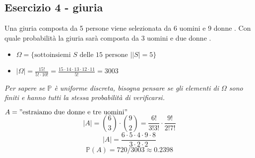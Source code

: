 \documentclass[12pt,a4paper, openany]{book}
\begin{document}
	\subsection*{Esercizio 4 - giuria }
	Una giuria composta da 5 persone viene selezionata da 6 uomini e 9 donne . Con quale probabilità la giuria sarà composta da 3 uomini e due donne .
	\begin{itemize}
		\item $\Omega = \{\text{sottoinsiemi } S \text{ delle 15 persone } | |S| = 5\}$ 
		\item $|\Omega| = \frac{15!}{5! \cdot 10!} = \frac{15 \cdot 14 \cdot 13 \cdot 12 \cdot 11}{5!} = 3003$ 
	\end{itemize}
	\textit{Per sapere se $\mathbb{P}$ è uniforme discreta, bisogna pensare se gli elementi di $\Omega$ sono finiti e hanno tutti la stessa probabilità di verificarsi.} 
	
	$A = "\text{estraiamo due donne e tre uomini}"$ 
	$$ |A| = \binom{6}{3} \cdot \binom{9}{2} = \frac{6!}{3!3!} \cdot \frac{9!}{2!7!} $$
	$$ |A| = \frac{6 \cdot 5 \cdot 4 \cdot 9 \cdot 8}{3 \cdot 2 \cdot 2} $$ 
	$$ \mathbb{P}(A) = 720 / 3003 \approx 0.2398 $$ 
\end{document}
